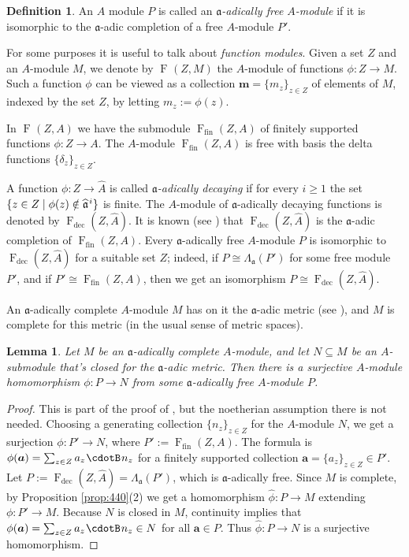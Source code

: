 \documentclass[10pt]{amsart}
\newtheorem{lem}[equation]{Lemma}
\theoremstyle{definition}
\newtheorem{dfn}[equation]{Definition}
\numberwithin{equation}{section}
\newcommand{\sub}{\subseteq}
\newcommand{\opn}{\operatorname}
\newcommand{\cd}{\mspace{1.3mu}{\cdotB}\mspace{1.3mu}}
\newcommand{\mfrak}[1]{\mathfrak{#1}}
\newcommand{\mrm}[1]{\mathrm{#1}}
\newcommand{\de}{\delta}
\newcommand{\La}{\Lambda}
\renewcommand{\a}{\mfrak{a}}
\newcommand{\ba}{\bsym{a}}
\newcommand{\bm}{\bsym{m}}
\newcommand{\bsym}[1]{\boldsymbol{#1}}
\newcommand{\what}[1]{\widehat{#1}}
\newcommand{\msp}[1]{\mspace{#1 mu}}
\begin{document}
\begin{dfn} \label{dfn:145}
An $A$ module $P$ is called an {\em $\a$-adically free $A$-module} if it is
isomorphic to the $\a$-adic completion of a free $A$-module $P'$.
\end{dfn}

For some purposes it is useful to talk about {\em function modules}.
Given a set $Z$ and an $A$-module $M$, we denote by
$\opn{F}_{}(Z, M)$ the $A$-module of functions $\phi : Z \to M$.
Such a function $\phi$ can be viewed as a collection
$\bm = \{ m_z \}_{z \in Z}$ of elements of $M$, indexed by the set $Z$,
by letting $m_z := \phi(z)$.

In $\opn{F}_{}(Z, A)$ we have the submodule
$\opn{F}_{\mrm{fin}}(Z, A)$ of finitely supported functions
$\phi : Z \to A$. The $A$-module $\opn{F}_{\mrm{fin}}(Z, A)$
is free with basis the delta functions
$\{ \de_z \}_{z \in Z}$.

A function $\phi : Z \to \what{A}$ is called {\em $\a$-adically decaying} if
for every $i \geq 1$ the set
$\{ z \in Z \mid \phi(z) \notin \what{\a}^{\msp{2} i} \}$ is finite.
The $A$-module of $\a$-adically decaying functions is
denoted by $\opn{F}_{\mrm{dec}}(Z, \what{A})$.
It is known (see \cite[Corollaries 2.9 and 3.6]{Ye1}) that
$\opn{F}_{\mrm{dec}}(Z, \what{A})$ is the $\a$-adic completion of
$\opn{F}_{\mrm{fin}}(Z, A)$.
Every $\a$-adically free $A$-module $P$ is isomorphic to
$\opn{F}_{\mrm{dec}}(Z, \what{A})$ for a suitable set $Z$; indeed, if
$P \cong \La_{\a}(P')$ for some free module $P'$, and if
$P' \cong \opn{F}_{\mrm{fin}}(Z, A)$,
then we get an isomorphism $P \cong \opn{F}_{\mrm{dec}}(Z, \what{A})$.

An $\a$-adically complete $A$-module $M$ has
on it the $\a$-adic metric (see \cite[end of Section 1]{Ye1}), and $M$ is
complete for this metric (in the usual sense of metric spaces).

\begin{lem} \label{lem:256}
Let $M$ be an $\a$-adically complete $A$-module, and let $N \sub M$ be an
$A$-submodule that's closed for the $\a$-adic metric. Then there is a
surjective $A$-module homomorphism $\phi : P \to N$ from some  $\a$-adically
free $A$-module $P$.
\end{lem}

\begin{proof}
This is part of the proof of \cite[Lemma 1.20]{PSY2}, but the noetherian
assumption there is not needed. Choosing a generating collection
$\{ n_z \}_{z \in Z}$ for the $A$-module $N$,
we get a surjection
$\phi : P' \to N$,
where $P' := \opn{F}_{\mrm{fin}}(Z, A)$. The formula is
$\phi(\ba) = \sum_{z \in Z} a_z \cd n_z$
for a finitely supported collection
$\ba = \{ a_z \}_{z \in Z} \in P'$.
Let $P := \opn{F}_{\mrm{dec}}(Z, \what{A}) = \La_{\a}(P')$,
which is $\a$-adically free.
Since $M$ is complete, by Proposition \ref{prop:440}(2) we get a homomorphism
$\what{\phi} : P \to M$ extending $\phi : P' \to M$.
Because $N$ is closed in $M$, continuity implies that
$\phi(\ba) = \sum_{z \in Z} a_z \cd n_z \in N$ for all $\ba \in P$. Thus
$\what{\phi} : P \to N$ is a surjective homomorphism.
\end{proof}
\end{document}
